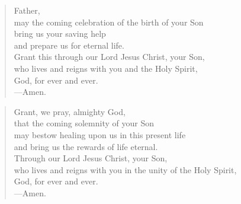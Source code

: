 \prayer

\setlength{\vleftmargin}{\prayerleftmargini}

\begin{verse}
Father,\\
may the coming celebration of the birth of your Son\\
bring us your saving help\\
and prepare us for eternal life.\\
Grant this through our Lord Jesus Christ, your Son,\\
who lives and reigns with you and the Holy Spirit,\\
God, for ever and ever.\\
{\color{red}---\thinspace}Amen.
\end{verse}


\begin{verse}
Grant, we pray, almighty God,\\
that the coming solemnity of your Son\\
may bestow healing upon us in this present life\\
and bring us the rewards of life eternal.\\
Through our Lord Jesus Christ, your Son,\\
who lives and reigns with you in the unity of the Holy Spirit,\\
God, for ever and ever.\\
{\color{red}---\thinspace}Amen.
\end{verse}

\setlength{\vleftmargin}{\defleftmargini}